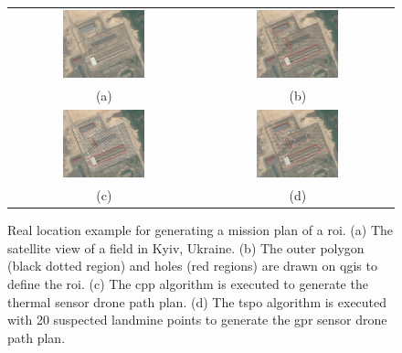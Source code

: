 \begin{figure}[h!]
    \centering
    \begin{tabular}{cc}
        \includegraphics[width=0.45\textwidth]{figs/Jihwan/map1.pdf} &
        \includegraphics[width=0.45\textwidth]{figs/Jihwan/map2.pdf} \\
        (a) & (b) \\[10pt]
        \includegraphics[width=0.45\textwidth]{figs/Jihwan/map3.pdf} &
        \includegraphics[width=0.45\textwidth]{figs/Jihwan/map4.pdf} \\
        (c) & (d)
    \end{tabular}
    \caption[Real Location Example for Mission Planning]
    {Real location example for generating a mission plan of a \gls{roi}. (a) The satellite view of a field in Kyiv, Ukraine. (b) The outer polygon (black dotted region) and holes (red regions) are drawn on \gls{qgis} to define the \gls{roi}. (c) The \gls{cpp} algorithm is executed to generate the thermal sensor drone path plan. (d) The \gls{tspo} algorithm is executed with 20 suspected landmine points to generate the \gls{gpr} sensor drone path plan. 
    }
    \label{fig:msp_example}
\end{figure}

